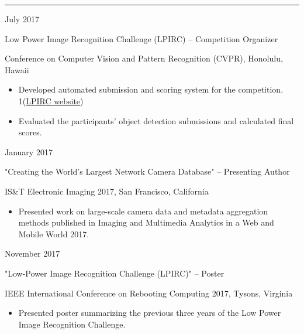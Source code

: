 \documentclass[10pt]{article}
\newlength{\cvcolumngapwidth}
\newlength{\cvleftcolumnwidth}
\newlength{\cvrightcolumnwidth}
\newcommand{\cvsectionstyle}[1]{{\normalsize\cvsectionfont\textcolor{cvsectioncolor}{#1}}}
\newcommand{\cvtitlestyle}[1]{{\large\cvtitlefont\textcolor{cvtitlecolor}{#1}}}
\newcommand{\cvdurationstyle}[1]{{\small\cvdurationfont\textcolor{cvdurationcolor}{#1}}}
\newlength{\cvafteritemskipamount}
\newlength{\cvaftersectionskipamount}
\newlength{\cvparskip}
\newcommand{\cvsection}[1]{
    \begin{minipage}[t]{\cvleftcolumnwidth}
        \raggedleft\cvsectionstyle{#1}
    \end{minipage}%
    \hspace{\cvcolumngapwidth}%
    \begin{minipage}[t]{\cvrightcolumnwidth}
        \textcolor{cvrulecolor}{\rule{\cvrightcolumnwidth}{0.3mm}}
    \end{minipage}

    \vspace{\cvaftersectionskipamount}
}
\newcommand{\cvitem}[2]{
    \begin{minipage}[t]{\cvleftcolumnwidth}
        \raggedleft #1
    \end{minipage}%
    \hspace{\cvcolumngapwidth}%
    \begin{minipage}[t]{\cvrightcolumnwidth}
        \setlength{\parskip}{\cvparskip} #2
    \end{minipage}

    \vspace{\cvafteritemskipamount}
}
\newcommand{\cvtitle}[1]{
    \cvtitlestyle{#1}

    \vspace{1mm plus 0.25mm minus 0.25mm}
    \vspace{-\cvparskip}
}
\def\online{1}
\begin{document}
{    %
}

\cvsection{EXPERIENCE}

\cvitem{
    \cvdurationstyle{July 2017}
}{
    \cvtitle{Low Power Image Recognition Challenge (LPIRC) – Competition Organizer}
    
    Conference on Computer Vision and Pattern Recognition (CVPR), Honolulu, Hawaii

    \begin{itemize}[leftmargin=*]
        \item Developed automated submission and scoring system for the competition. \if\online1(\href{https://rebootingcomputing.ieee.org/lpirc}{LPIRC website})\fi
        \item Evaluated the participants' object detection submissions and calculated final scores.
    \end{itemize}
}

\cvitem{
    \cvdurationstyle{January 2017}
}{
    \cvtitle{"Creating the World’s Largest Network Camera Database" – Presenting Author}

    IS\&T Electronic Imaging 2017, San Francisco, California

    \begin{itemize}[leftmargin=*]
        \item Presented work on large-scale camera data and metadata aggregation methods published in Imaging and Multimedia Analytics in a Web and Mobile World 2017.
    \end{itemize}
}

\cvitem{
    \cvdurationstyle{November 2017}
}{
    \cvtitle{"Low-Power Image Recognition Challenge (LPIRC)" – Poster}
    
    IEEE International Conference on Rebooting Computing 2017, Tysons, Virginia

    \begin{itemize}[leftmargin=*]
        \item Presented poster summarizing the previous three years of the Low Power Image Recognition Challenge.
    \end{itemize}
}
\end{document}
